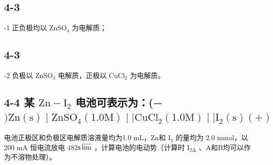 \subsection*{4-3}
-1 正负极均以 $\mathrm { Z n S O _ { 4 } }$ 为电解质；

\subsection*{4-3}
-2 负极以 $\mathrm { Z n S O _ { 4 } }$ 电解质，正极以 $\mathrm { C u C l _ { 2 } }$ 为电解质。

\subsection*{4-4 某 $\mathrm { Z n - I _ { 2 } }$ 电池可表⽰为：(− $\mathrm { ) Z n ( s ) \mid Z n S O _ { 4 } ( 1 . 0 M ) \mid \mid C u C l _ { 2 } ( 1 . 0 M ) \mid \mid I _ { 2 } ( s ) ( + ) }$}

电池正极区和负极区电解质溶液量均为1.0 mL，Zn和 $\mathrm { I } _ { 2 }$ 的量均为 2.0 mmol，以200 mA 恒电流放电 482$\mathsf { s } \varlimsup$ ，计算电池的电动势（计算时 $\mathrm { I } _ { 2 \mathrm { \Delta } }$ 、A和B均可以作为不溶物处理）。
